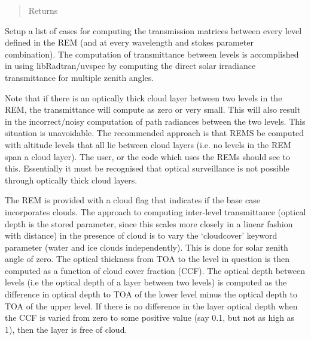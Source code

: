 \documentclass[a4paper,10pt,english]{sphinxmanual}
\begin{document}
\begin{fulllineitems}
\begin{fulllineitems}
\begin{quote}
\begin{description}
\item[{Returns}] \leavevmode


\end{description}\end{quote}

\end{fulllineitems}


\begin{fulllineitems}
\label{packages:librad.RadEnv.setup_trans_cases}
Setup a list of cases for computing the transmission matrices between every level defined in the
REM (and at every wavelength and stokes parameter combination). The computation of  transmittance between
levels is accomplished in  using libRadtran/uvspec by computing the direct solar irradiance
transmittance for multiple zenith angles.

Note that if there is an optically thick cloud layer between two levels in the REM, the transmittance
will compute as zero or very small. This will also result in the incorrect/noisy computation of path
radiances between the two levels. This situation is unavoidable. The recommended approach is that
REMS be computed with altitude levels that all lie between cloud layers (i.e. no levels in the REM
span a cloud layer). The user, or the code which uses the REMs should see to this. Essentially it must
be recognised that optical surveillance is not possible through optically thick cloud layers.

The REM is provided with a cloud flag that indicates if the base case incorporates clouds. The approach to
computing inter-level transmittance (optical depth is the stored parameter, since this scales more
closely in a linear fashion with distance) in the presence of cloud is to vary the `cloudcover'
keyword parameter (water and ice clouds independently). This is done for solar zenith angle of zero.
The optical thickness from TOA to the level in question is then computed as a function of cloud cover
fraction (CCF). The optical depth between levels (i.e the optical depth of a layer between two levels)
is computed as the difference in optical depth to TOA of the lower level minus the optical depth to TOA
of the upper level. If there is no difference in the layer optical depth when the CCF is varied from
zero to some positive value (say 0.1, but not as high as 1), then the layer is free of cloud.


\end{fulllineitems}
\end{fulllineitems}
\end{document}
